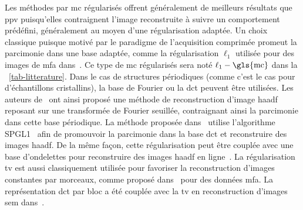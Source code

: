 Les méthodes par \gls{mc} régularisés offrent généralement de meilleurs résultats que \gls{ppv} puisqu'elles contraignent l'image reconstruite à suivre un comportement prédéfini, généralement au moyen d'une régularisation adaptée. Un choix classique puisque motivé par le paradigme de l'acquisition comprimée promeut la parcimonie dans une base adaptée, comme la régularisation $\ell_1$ utilisée pour des images de \gls{mfa} dans~\cite{han2018optimal}. Ce type de \gls{mc} régularisés sera noté $\ell_1-\mathrm{\gls{mc}}$ dans la \tabname~\ref{tab-litterature}. %
Dans le cas de structures périodiques (comme c'est le cas pour d'échantillons cristallins), la base de Fourier ou la \gls{dct} peuvent être utilisées. Les auteurs de~\cite{stevens2018apl} ont ainsi proposé une méthode de reconstruction d'image \gls{haadf} reposant sur une transformée de Fourier seuillée, contraignant ainsi la parcimonie dans cette base périodique. La méthode proposée dans~\cite{beche2016development} utilise l'algorithme SPGL1~\cite{berg2008probing} afin de promouvoir la parcimonie dans la base \gls{dct} et reconstruire des images \gls{haadf}. De la même façon, cette régularisation peut être couplée avec une base d'ondelettes pour reconstruire des images \gls{haadf} en ligne~\cite{li2018compressed}. %
%
La régularisation \gls{tv} est aussi classiquement utilisée pour favoriser la reconstruction d'images constantes par morceaux, comme proposé dans~\cite{han2018optimal} pour des données \gls{mfa}. La représentation \gls{dct} par bloc a été couplée avec la \gls{tv} en reconstruction d'images \gls{sem} dans~\cite{anderson2013sparse}.%



